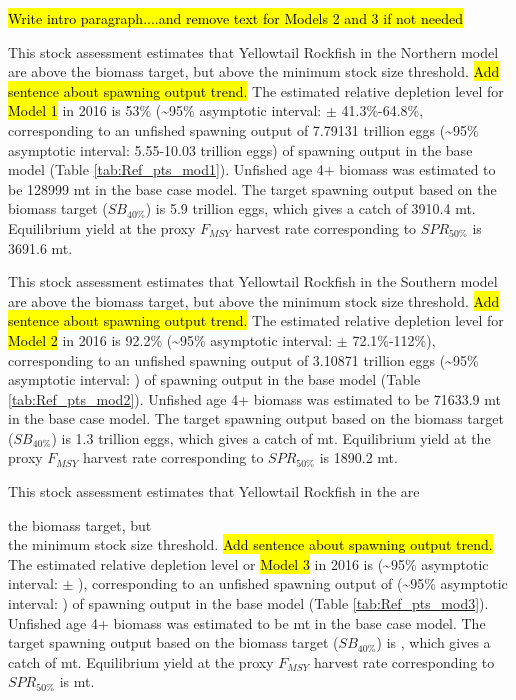 \documentclass[12pt,]{article}
\begin{document}
\hl{Write intro paragraph....and remove text for Models 2 and 3 if not needed}

This stock assessment estimates that Yellowtail Rockfish in the Northern
model are above the biomass target, but above the minimum stock size
threshold. \hl{Add sentence about spawning output trend.} The estimated
relative depletion level for \hl{Model 1} in 2016 is 53\%
(\textasciitilde{}95\% asymptotic interval: \(\pm\) 41.3\%-64.8\%,
corresponding to an unfished spawning output of 7.79131 trillion eggs
(\textasciitilde{}95\% asymptotic interval: 5.55-10.03 trillion eggs) of
spawning output in the base model (Table \ref{tab:Ref_pts_mod1}).
Unfished age 4+ biomass was estimated to be 128999 mt in the base case
model. The target spawning output based on the biomass target
(\(SB_{40\%}\)) is 5.9 trillion eggs, which gives a catch of 3910.4 mt.
Equilibrium yield at the proxy \(F_{MSY}\) harvest rate corresponding to
\(SPR_{50\%}\) is 3691.6 mt.

This stock assessment estimates that Yellowtail Rockfish in the Southern
model are above the biomass target, but above the minimum stock size
threshold. \hl{Add sentence about spawning output trend.} The estimated
relative depletion level for \hl{Model 2} in 2016 is 92.2\%
(\textasciitilde{}95\% asymptotic interval: \(\pm\) 72.1\%-112\%),
corresponding to an unfished spawning output of 3.10871 trillion eggs
(\textasciitilde{}95\% asymptotic interval: ) of spawning output in the
base model (Table \ref{tab:Ref_pts_mod2}). Unfished age 4+ biomass was
estimated to be 71633.9 mt in the base case model. The target spawning
output based on the biomass target (\(SB_{40\%}\)) is 1.3 trillion eggs,
which gives a catch of mt. Equilibrium yield at the proxy \(F_{MSY}\)
harvest rate corresponding to \(SPR_{50\%}\) is 1890.2 mt.

This stock assessment estimates that Yellowtail Rockfish in the are

the biomass target, but\\
the minimum stock size threshold.
\hl{Add sentence about spawning output trend.} The estimated relative
depletion level or \hl{Model 3} in 2016 is (\textasciitilde{}95\%
asymptotic interval: \(\pm\) ), corresponding to an unfished spawning
output of (\textasciitilde{}95\% asymptotic interval: ) of spawning
output in the base model (Table \ref{tab:Ref_pts_mod3}). Unfished age 4+
biomass was estimated to be mt in the base case model. The target
spawning output based on the biomass target (\(SB_{40\%}\)) is , which
gives a catch of mt. Equilibrium yield at the proxy \(F_{MSY}\) harvest
rate corresponding to \(SPR_{50\%}\) is mt.
\end{document}
